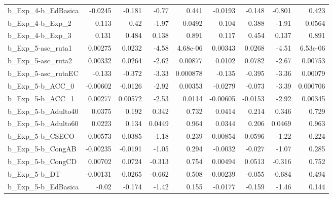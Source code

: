 \begin{tabular}{lrrrrrrrr}
b\_Exp\_4-b\_EdBasica         &     -0.0245 &       -0.181 &    -0.77 &    0.441 &    -0.0193 &      -0.148 &       -0.801 &         0.423 \\
b\_Exp\_4-b\_Exp\_2            &       0.113 &         0.42 &    -1.97 &   0.0492 &      0.104 &       0.388 &        -1.91 &        0.0564 \\
b\_Exp\_4-b\_Exp\_3            &       0.131 &        0.484 &    0.138 &    0.891 &      0.117 &       0.454 &        0.137 &         0.891 \\
b\_Exp\_5-asc\_ruta1          &     0.00275 &       0.0232 &    -4.58 & 4.68e-06 &    0.00343 &      0.0268 &        -4.51 &      6.53e-06 \\
b\_Exp\_5-asc\_ruta2          &     0.00332 &       0.0264 &    -2.62 &  0.00877 &     0.0102 &      0.0782 &        -2.67 &       0.00753 \\
b\_Exp\_5-asc\_rutaEC         &      -0.133 &       -0.372 &    -3.33 & 0.000878 &     -0.135 &      -0.395 &        -3.36 &       0.00079 \\
b\_Exp\_5-b\_ACC\_0            &    -0.00602 &      -0.0126 &    -2.92 &  0.00353 &    -0.0279 &      -0.073 &        -3.39 &      0.000706 \\
b\_Exp\_5-b\_ACC\_1            &     0.00277 &      0.00572 &    -2.53 &   0.0114 &   -0.00605 &     -0.0153 &        -2.92 &       0.00345 \\
b\_Exp\_5-b\_Adulto40         &      0.0375 &        0.192 &    0.342 &    0.732 &     0.0414 &       0.214 &        0.346 &         0.729 \\
b\_Exp\_5-b\_Adulto60         &      0.0223 &        0.134 &   0.0449 &    0.964 &     0.0344 &       0.206 &       0.0469 &         0.963 \\
b\_Exp\_5-b\_CSECO            &     0.00573 &       0.0385 &    -1.18 &    0.239 &    0.00854 &      0.0596 &        -1.22 &         0.224 \\
b\_Exp\_5-b\_CongAB           &    -0.00235 &      -0.0191 &    -1.05 &    0.294 &    -0.0032 &      -0.027 &        -1.07 &         0.285 \\
b\_Exp\_5-b\_CongCD           &     0.00702 &       0.0724 &   -0.313 &    0.754 &    0.00494 &      0.0513 &       -0.316 &         0.752 \\
b\_Exp\_5-b\_DT               &    -0.00131 &      -0.0265 &   -0.662 &    0.508 &   -0.00239 &      -0.055 &       -0.684 &         0.494 \\
b\_Exp\_5-b\_EdBasica         &       -0.02 &       -0.174 &    -1.42 &    0.155 &    -0.0177 &      -0.159 &        -1.46 &         0.144 \\

\end{tabular}
